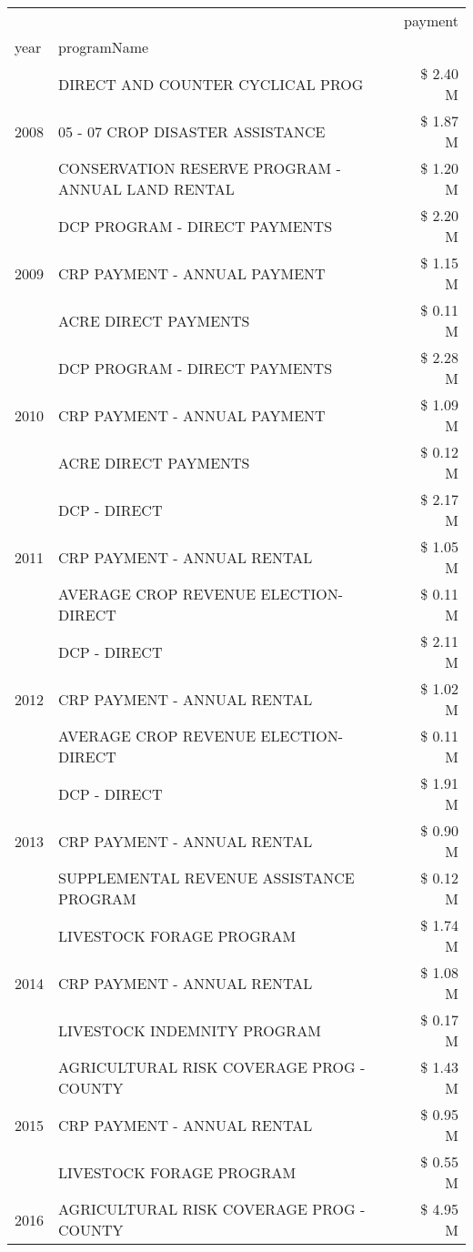 \begin{tabular}{llr}
\toprule
 &  & payment \\
year & programName &  \\
\midrule
\multirow[t]{3}{*}{2008} & DIRECT AND COUNTER CYCLICAL PROG & \$ 2.40 M \\
 & 05 - 07 CROP DISASTER ASSISTANCE & \$ 1.87 M \\
 & CONSERVATION RESERVE PROGRAM - ANNUAL LAND RENTAL & \$ 1.20 M \\
\cline{1-3}
\multirow[t]{3}{*}{2009} & DCP PROGRAM - DIRECT PAYMENTS & \$ 2.20 M \\
 & CRP PAYMENT - ANNUAL PAYMENT & \$ 1.15 M \\
 & ACRE DIRECT PAYMENTS & \$ 0.11 M \\
\cline{1-3}
\multirow[t]{3}{*}{2010} & DCP PROGRAM - DIRECT PAYMENTS & \$ 2.28 M \\
 & CRP PAYMENT - ANNUAL PAYMENT & \$ 1.09 M \\
 & ACRE DIRECT PAYMENTS & \$ 0.12 M \\
\cline{1-3}
\multirow[t]{3}{*}{2011} & DCP - DIRECT & \$ 2.17 M \\
 & CRP PAYMENT - ANNUAL RENTAL & \$ 1.05 M \\
 & AVERAGE CROP REVENUE ELECTION-DIRECT & \$ 0.11 M \\
\cline{1-3}
\multirow[t]{3}{*}{2012} & DCP - DIRECT & \$ 2.11 M \\
 & CRP PAYMENT - ANNUAL RENTAL & \$ 1.02 M \\
 & AVERAGE CROP REVENUE ELECTION-DIRECT & \$ 0.11 M \\
\cline{1-3}
\multirow[t]{3}{*}{2013} & DCP - DIRECT & \$ 1.91 M \\
 & CRP PAYMENT - ANNUAL RENTAL & \$ 0.90 M \\
 & SUPPLEMENTAL REVENUE ASSISTANCE PROGRAM & \$ 0.12 M \\
\cline{1-3}
\multirow[t]{3}{*}{2014} & LIVESTOCK FORAGE PROGRAM & \$ 1.74 M \\
 & CRP PAYMENT - ANNUAL RENTAL & \$ 1.08 M \\
 & LIVESTOCK INDEMNITY PROGRAM & \$ 0.17 M \\
\cline{1-3}
\multirow[t]{3}{*}{2015} & AGRICULTURAL RISK COVERAGE PROG - COUNTY & \$ 1.43 M \\
 & CRP PAYMENT - ANNUAL RENTAL & \$ 0.95 M \\
 & LIVESTOCK FORAGE PROGRAM & \$ 0.55 M \\
\cline{1-3}
\multirow[t]{3}{*}{2016} & AGRICULTURAL RISK COVERAGE PROG - COUNTY & \$ 4.95 M \\

\end{tabular}
